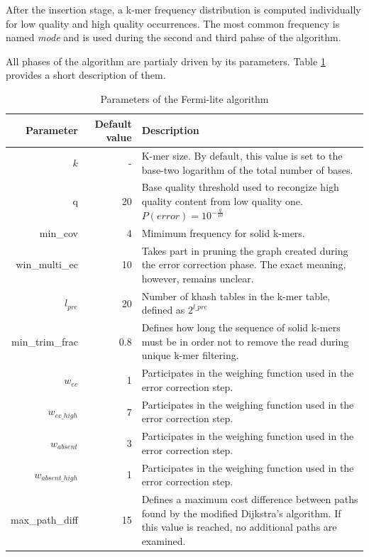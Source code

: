 After the insertion stage, a k-mer frequency distribution is computed individually for low quality and high quality occurrences. The most common frequency is named \textit{mode} and is used during the second and third pahse of the algorithm.

All phases of the algorithm are partialy driven by its parameters. Table \ref{tab:fermi-parameters} provides a short description of them.

\begin{table}[h]
\begin{center}
\caption{Parameters of the Fermi-lite algorithm}
\label{tab:fermi-parameters}
\begin{tabular}{| r | r | p{5cm} |}
\hline
Parameter & Default value & Description \\
\hline
$k$ & - & K-mer size. By default, this value is set to the base-two logarithm of the total number of bases. \\
\hline
q & 20 & Base quality threshold used to recongize high quality content from low quality one. $P(error) = 10^{-\frac{q}{10}}$ \\
\hline
min\_cov & 4 & Mimimum frequency for solid k-mers. \\
\hline
win\_multi\_ec & 10 & Takes part in pruning the graph created during the error correction phase. The exact meaning, however, remains unclear. \\
\hline
$l_{pre}$ & 20 & Number of khash tables in the k-mer table, defined as $2^{l\_pre}$ \\
\hline
min\_trim\_frac & 0.8 &  Defines how long the sequence of solid k-mers must be in order not to remove the read during unique k-mer filtering. \\
\hline
$w_{ec}$ & 1 & Participates in the weighing function used in the error correction step.\\
\hline
$w_{ec\_high}$ & 7 & Participates in the weighing function used in the error correction step. \\
\hline
$w_{absent}$ & 3 & Participates in the weighing function used in the error correction step. \\
\hline
$w_{absent\_high}$ & 1 & Participates in the weighing function used in the error correction step. \\ 
\hline
max\_path\_diff & 15 & Defines a maximum cost difference between paths found by the modified Dijkstra's algorithm. If this value is reached, no additional paths are examined. \\ 
\hline
\end{tabular}
\end{center}
\end{table}

